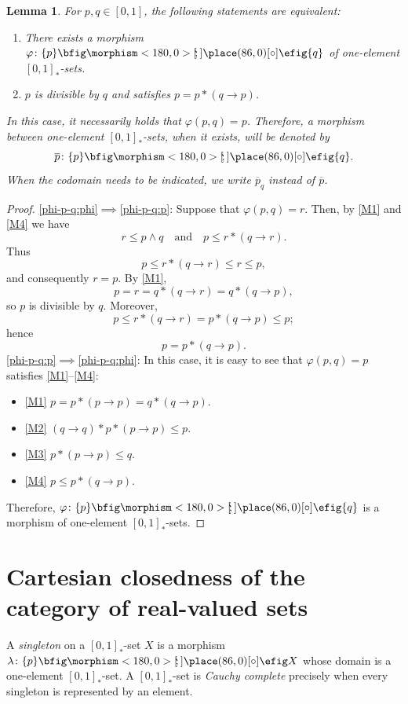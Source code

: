 \documentclass{birkau}
\theoremstyle{plain}
\newtheorem{lem}[thm]{Lemma}
\theoremstyle{definition}
\def\oto{{\bfig\morphism<180,0>[\mkern-4mu`\mkern-4mu;]\place(86,0)[\circ]\efig}}
\newcommand{\ra}{\rightarrow}
\renewcommand{\phi}{\varphi}
\newcommand{\lam}{\lambda}
\renewcommand{\leq}{\leqslant}
\numberwithin{equation}{section}
\begin{document}
\begin{lem} \label{phi-p-q}
For $p,q\in[0,1]$, the following statements are equivalent:
\begin{enumerate}[label={\rm(\roman*)}]
\item \label{phi-p-q:phi} There exists a morphism $\phi\colon\{p\}\oto\{q\}$ of one-element $[0,1]_*$-sets.
\item \label{phi-p-q:p} $p$ is divisible by $q$ and satisfies $p=p*(q\ra p)$.
\end{enumerate}
In this case, it necessarily holds that $\phi(p,q)=p$. Therefore, a morphism between one-element $[0,1]_*$-sets, when it exists, will be denoted by
\[\overline{p}\colon\{p\}\oto\{q\}.\]
When the codomain needs to be indicated, we write $\overline{p}_q$ instead of $\overline{p}$.
\end{lem}
\begin{proof}
\ref{phi-p-q:phi}$\implies$\ref{phi-p-q:p}: Suppose that $\phi(p,q)=r$. Then, by \ref{M1} and \ref{M4} we have
\begin{equation} \label{phi-p-q:M134}
r\leq p\wedge q\quad\text{and}\quad p\leq r*(q\ra r).
\end{equation}
Thus
\[p\leq r*(q\ra r)\leq r\leq p,\] 
and consequently $r=p$. By \ref{M1},
\[p=r=q*(q\ra r)=q*(q\ra p),\]
so $p$ is divisible by $q$. Moreover,
\[p\leq r*(q\ra r)=p*(q\ra p)\leq p;\]
hence
\begin{equation} \label{p=p*(q-ra-p)}
p=p*(q\ra p).
\end{equation}
\ref{phi-p-q:p}$\implies$\ref{phi-p-q:phi}: In this case, it is easy to see that $\phi(p,q)=p$ satisfies \ref{M1}--\ref{M4}:
\begin{itemize}
\item \ref{M1} $p=p*(p\ra p)=q*(q\ra p)$.
\item \ref{M2} $(q\ra q)*p*(p\ra p)\leq p$.
\item \ref{M3} $p*(p\ra p)\leq q$.
\item \ref{M4} $p\leq p*(q\ra p)$.
\end{itemize}
Therefore, $\phi\colon\{p\}\oto\{q\}$ is a morphism of one-element $[0,1]_*$-sets.
\end{proof} 

\section{Cartesian closedness of the category of real-valued sets}
\label{cartesian-closedness-of-real-valued-sets}

A \emph{singleton} on a $[0,1]_*$-set $X$ is a morphism $\lam\colon\{p\}\oto X$ whose domain is a one-element $[0,1]_*$-set. A $[0,1]_*$-set is \emph{Cauchy complete} precisely when every singleton is represented by an element.
\end{document}
